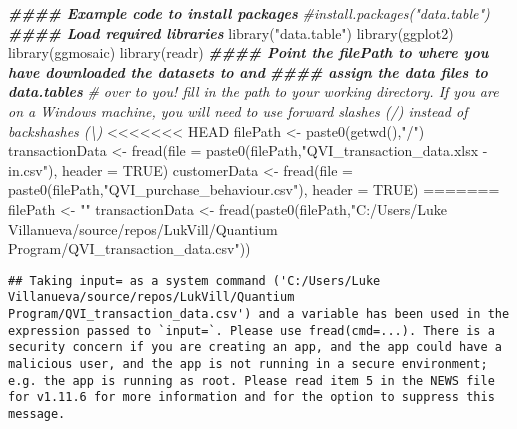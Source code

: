 \documentclass[
]{article}
\newenvironment{Shaded}{\begin{snugshade}}{\end{snugshade}}
\newcommand{\AttributeTok}[1]{\textcolor[rgb]{0.77,0.63,0.00}{#1}}
\newcommand{\CommentTok}[1]{\textcolor[rgb]{0.56,0.35,0.01}{\textit{#1}}}
\newcommand{\ConstantTok}[1]{\textcolor[rgb]{0.00,0.00,0.00}{#1}}
\newcommand{\DocumentationTok}[1]{\textcolor[rgb]{0.56,0.35,0.01}{\textbf{\textit{#1}}}}
\newcommand{\FunctionTok}[1]{\textcolor[rgb]{0.00,0.00,0.00}{#1}}
\newcommand{\NormalTok}[1]{#1}
\newcommand{\OtherTok}[1]{\textcolor[rgb]{0.56,0.35,0.01}{#1}}
\newcommand{\StringTok}[1]{\textcolor[rgb]{0.31,0.60,0.02}{#1}}
\begin{document}
\begin{Shaded}
\begin{Highlighting}[]
\DocumentationTok{\#\#\#\# Example code to install packages}
\CommentTok{\#install.packages("data.table")}
\DocumentationTok{\#\#\#\# Load required libraries}
\FunctionTok{library}\NormalTok{(}\StringTok{"data.table"}\NormalTok{)}
\FunctionTok{library}\NormalTok{(ggplot2)}
\FunctionTok{library}\NormalTok{(ggmosaic)}
\FunctionTok{library}\NormalTok{(readr)}
\DocumentationTok{\#\#\#\# Point the filePath to where you have downloaded the datasets to and }
\DocumentationTok{\#\#\#\# assign the data files to data.tables}
\CommentTok{\# over to you! fill in the path to your working directory. If you are on a Windows machine, you will need to use forward slashes (/) instead of backshashes (\textbackslash{})}
<<<<<<< HEAD
\NormalTok{filePath }\OtherTok{\textless{}{-}} \FunctionTok{paste0}\NormalTok{(}\FunctionTok{getwd}\NormalTok{(),}\StringTok{"/"}\NormalTok{)}
\NormalTok{transactionData }\OtherTok{\textless{}{-}} \FunctionTok{fread}\NormalTok{(}\AttributeTok{file =} \FunctionTok{paste0}\NormalTok{(filePath,}\StringTok{"QVI\_transaction\_data.xlsx {-} in.csv"}\NormalTok{), }\AttributeTok{header =} \ConstantTok{TRUE}\NormalTok{)}
\NormalTok{customerData }\OtherTok{\textless{}{-}} \FunctionTok{fread}\NormalTok{(}\AttributeTok{file =} \FunctionTok{paste0}\NormalTok{(filePath,}\StringTok{"QVI\_purchase\_behaviour.csv"}\NormalTok{), }\AttributeTok{header =} \ConstantTok{TRUE}\NormalTok{)}
=======
\NormalTok{filePath }\OtherTok{\textless{}{-}} \StringTok{""}
\NormalTok{transactionData }\OtherTok{\textless{}{-}} \FunctionTok{fread}\NormalTok{(}\FunctionTok{paste0}\NormalTok{(filePath,}\StringTok{"C:/Users/Luke Villanueva/source/repos/LukVill/Quantium Program/QVI\_transaction\_data.csv"}\NormalTok{))}
\end{Highlighting}
\end{Shaded}

\begin{verbatim}
## Taking input= as a system command ('C:/Users/Luke Villanueva/source/repos/LukVill/Quantium Program/QVI_transaction_data.csv') and a variable has been used in the expression passed to `input=`. Please use fread(cmd=...). There is a security concern if you are creating an app, and the app could have a malicious user, and the app is not running in a secure environment; e.g. the app is running as root. Please read item 5 in the NEWS file for v1.11.6 for more information and for the option to suppress this message.
\end{verbatim}
\end{document}
